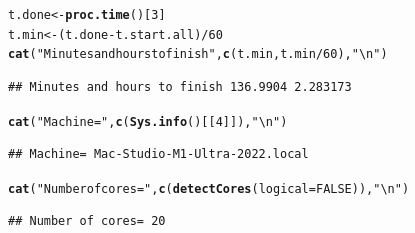 \documentclass[9pt]{article}\usepackage[]{graphicx}\usepackage[]{xcolor}
\makeatletter
\newcommand{\hlnum}[1]{\textcolor[rgb]{0.686,0.059,0.569}{#1}}%
\newcommand{\hlstr}[1]{\textcolor[rgb]{0.192,0.494,0.8}{#1}}%
\newcommand{\hlopt}[1]{\textcolor[rgb]{0,0,0}{#1}}%
\newcommand{\hlstd}[1]{\textcolor[rgb]{0.345,0.345,0.345}{#1}}%
\newcommand{\hlkwb}[1]{\textcolor[rgb]{0.69,0.353,0.396}{#1}}%
\newcommand{\hlkwc}[1]{\textcolor[rgb]{0.333,0.667,0.333}{#1}}%
\newcommand{\hlkwd}[1]{\textcolor[rgb]{0.737,0.353,0.396}{\textbf{#1}}}%
\newenvironment{kframe}{%
 \def\at@end@of@kframe{}%
 \ifinner\ifhmode%
  \def\at@end@of@kframe{\end{minipage}}%
  \begin{minipage}{\columnwidth}%
 \fi\fi%
 \def\FrameCommand##1{\hskip\@totalleftmargin \hskip-\fboxsep
 \colorbox{shadecolor}{##1}\hskip-\fboxsep
     \hskip-\linewidth \hskip-\@totalleftmargin \hskip\columnwidth}%
 \MakeFramed {\advance\hsize-\width
   \@totalleftmargin\z@ \linewidth\hsize
   \@setminipage}}%
 {\par\unskip\endMakeFramed%
 \at@end@of@kframe}
\newenvironment{knitrout}{}{} %
\theoremstyle{definition}
\theoremstyle{remark}
\makeatother
\begin{document}
\begin{knitrout}
\color{fgcolor}\begin{kframe}
\begin{alltt}
\hlstd{t.done} \hlkwb{<-} \hlkwd{proc.time}\hlstd{()[}\hlnum{3}\hlstd{]}
\hlstd{t.min} \hlkwb{<-} \hlstd{(t.done} \hlopt{-} \hlstd{t.start.all)}\hlopt{/}\hlnum{60}
\hlkwd{cat}\hlstd{(}\hlstr{"Minutes and hours to finish"}\hlstd{,} \hlkwd{c}\hlstd{(t.min, t.min}\hlopt{/}\hlnum{60}\hlstd{),} \hlstr{"\textbackslash{}n"}\hlstd{)}
\end{alltt}
\begin{verbatim}
## Minutes and hours to finish 136.9904 2.283173
\end{verbatim}
\begin{alltt}
\hlkwd{cat}\hlstd{(}\hlstr{"Machine="}\hlstd{,} \hlkwd{c}\hlstd{(}\hlkwd{Sys.info}\hlstd{()[[}\hlnum{4}\hlstd{]]),} \hlstr{"\textbackslash{}n"}\hlstd{)}
\end{alltt}
\begin{verbatim}
## Machine= Mac-Studio-M1-Ultra-2022.local
\end{verbatim}
\begin{alltt}
\hlkwd{cat}\hlstd{(}\hlstr{"Number of cores="}\hlstd{,} \hlkwd{c}\hlstd{(}\hlkwd{detectCores}\hlstd{(}\hlkwc{logical} \hlstd{=} \hlnum{FALSE}\hlstd{)),} \hlstr{"\textbackslash{}n"}\hlstd{)}
\end{alltt}
\begin{verbatim}
## Number of cores= 20
\end{verbatim}
\end{kframe}
\end{knitrout}
\end{document}
